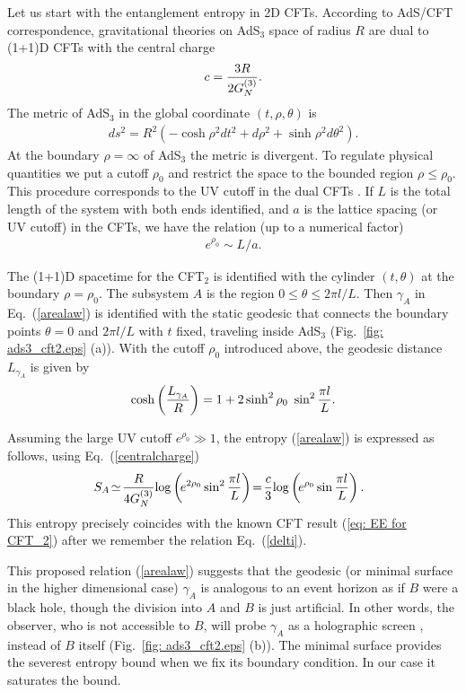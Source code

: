 \documentclass[amsmath,amssymb,nofootinbib,eqsecnum,tighten,prd,12pt]{revtex4}
\def\frac#1#2{{#1\over #2}}
\def\f {\frac}
\def\frac#1#2{{#1\over #2}}
\def\be{\begin{equation}}
\def\ee{\end{equation}}
\begin{document}
Let us start with the entanglement entropy in 2D CFTs.
According to AdS/CFT correspondence, gravitational theories on
AdS$_3$ space of radius $R$ are dual to (1+1)D CFTs with
the central charge  \cite{BH}
\be c=\frac{3R}{2G^{(3)}_N}. \label{centralcharge} \ee
The metric of AdS$_3$ in the
global coordinate $(t,\rho,\theta)$  is
\begin{eqnarray}
ds^2=R^2\left(-\cosh\rho^2
dt^2+d\rho^2+\sinh\rho^2d\theta^2\right). \label{ads}
\end{eqnarray}
At the boundary $\rho=\infty$ of AdS$_3$ the metric is
divergent. To regulate physical quantities we put a
cutoff $\rho_0$ and restrict the space to the bounded region
$\rho\leq\rho_0$. This procedure corresponds to
the UV cutoff in the dual CFTs \cite{SuWi}.
If $L$ is the total
length of the system with both ends identified, and $a$ is the
lattice spacing (or UV cutoff) in the CFTs,
we have the relation (up to a numerical factor)
\begin{eqnarray}
e^{\rho_0}\sim L/a. \label{cutoff}
\label{delti}
\end{eqnarray}

The (1+1)D spacetime for the CFT$_2$ is identified with the cylinder
$(t,\theta)$ at the boundary $\rho=\rho_0$. The subsystem $A$ is the
region $0\leq \theta\leq 2\pi l/L$. Then $\gamma_A$ in  Eq.\
(\ref{arealaw}) is identified with the static geodesic
 that connects the boundary points
$\theta=0$ and $2\pi l/L$ with $t$ fixed,
traveling inside AdS$_3$
(Fig.\ \ref{fig: ads3_cft2.eps} (a)).
With the cutoff $\rho_0$ introduced above,
the geodesic distance $L_{\gamma_A}$
is given by
\begin{eqnarray}
\cosh\left(\f{L_{\gamma_A}}{R}\right)=1+2\sinh^2\rho_0~\sin^2\frac{\pi l}{L}.
\label{geodesic}
\end{eqnarray}

Assuming the large UV cutoff  $e^{\rho_0}\gg 1$,
the entropy (\ref{arealaw}) is expressed as follows, using Eq.\ (\ref{centralcharge})
\begin{eqnarray}
S_A
\!\simeq\!
\frac{R}{4G^{(3)}_N}\!\log\left(\!e^{2\rho_0}\sin^2\frac{\pi l}{L}\right)
\! =\!
\frac{c}{3}\!\log\left(\!e^{\rho_0}\sin\frac{\pi l}{L}\right).~~
\end{eqnarray}
This entropy precisely coincides with the known CFT result
(\ref{eq: EE for CFT_2})
after we remember the relation Eq.\ (\ref{delti}).

This proposed relation (\ref{arealaw}) suggests that the geodesic
 (or minimal surface in the higher dimensional case)
 $\gamma_A$ is analogous to an event
 horizon as if $B$ were a black hole, though
 the division into $A$ and $B$ is just artificial. In other
words, the observer, who is not accessible to $B$, will probe
$\gamma_A$ as a holographic screen \cite{holography}, instead of $B$
itself (Fig.\ \ref{fig: ads3_cft2.eps} (b)). The minimal surface
provides the severest entropy bound when we fix its boundary
condition. In our case it saturates the bound.
\end{document}
